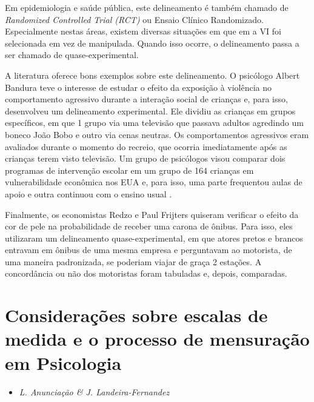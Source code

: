 \documentclass[
]{book}
\providecommand{\tightlist}{%
  \setlength{\itemsep}{0pt}\setlength{\parskip}{0pt}}
\begin{document}
Em epidemiologia e saúde pública, este delineamento é também chamado de \emph{Randomized Controlled Trial (RCT)} ou Ensaio Clínico Randomizado. Especialmente nestas áreas, existem diversas situações em que em a VI foi selecionada em vez de manipulada. Quando isso ocorre, o delineamento passa a ser chamado de quase-experimental.

A literatura oferece bons exemplos sobre este delineamento. O psicólogo Albert Bandura \citeyearpar{Bandura1961} teve o interesse de estudar o efeito da exposição à violência no comportamento agressivo durante a interação social de crianças e, para isso, desenvolveu um delineamento experimental. Ele dividiu as crianças em grupos específicos, em que 1 grupo via uma televisão que passava adultos agredindo um boneco João Bobo e outro via cenas neutras. Os comportamentos agressivos eram avaliados durante o momento do recreio, que ocorria imediatamente após as crianças terem visto televisão. Um grupo de psicólogos visou comparar dois programas de intervenção escolar em um grupo de 164 crianças em vulnerabilidade econômica nos EUA e, para isso, uma parte frequentou aulas de apoio e outra continuou com o ensino usual \citep{Feil2020}.

Finalmente, os economistas Redzo e Paul Frijters \citeyearpar{Mujcic2020} quiseram verificar o efeito da cor de pele na probabilidade de receber uma carona de ônibus. Para isso, eles utilizaram um delineamento quase-experimental, em que atores pretos e brancos entravam em ônibus de uma mesma empresa e perguntavam ao motorista, de uma maneira padronizada, se poderiam viajar de graça 2 estações. A concordância ou não dos motoristas foram tabuladas e, depois, comparadas.

\hypertarget{considerauxe7uxf5es-sobre-escalas-de-medida-e-o-processo-de-mensurauxe7uxe3o-em-psicologia}{%
\section{Considerações sobre escalas de medida e o processo de mensuração em Psicologia}\label{considerauxe7uxf5es-sobre-escalas-de-medida-e-o-processo-de-mensurauxe7uxe3o-em-psicologia}}

\begin{itemize}
\tightlist
\item
  \emph{L. Anunciação \& J. Landeira-Fernandez}
\end{itemize}
\end{document}
